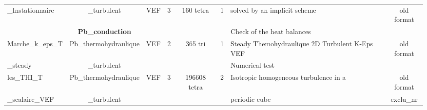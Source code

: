 \begin{table}[H]
\begin{centering}
\begin{tabular}{lclccclc}
\rowcolor{Blue!10}\_Instationnaire & \_turbulent & VEF & 3 & 160 tetra & 1 & solved by an implicit scheme & old format \\ 
\rowcolor{Blue!10} & \textbf{Pb\_conduction} & & & & & Check of the heat balances & \\
\hline
\rowcolor{Blue!10}Marche\_k\_eps\_T & Pb\_thermohydraulique & VEF & 2 & 365 tri & 1 & Steady Themohydraulique 2D Turbulent K-Eps VEF & old format \\ 
\rowcolor{Blue!10}\_steady & \_turbulent & & & & & Numerical test & \\
\hline
\rowcolor{Blue!10}les\_THI\_T & Pb\_thermohydraulique & VEF & 3 & 196608 tetra & 2 & Isotropic homogeneous turbulence in a & old format \\ 
\rowcolor{Blue!10}\_scalaire\_VEF & \_turbulent & & & & & periodic cube & exclu\_nr\\
\hline
\end{tabular}
\end{centering}
\end{table}

\newpage

